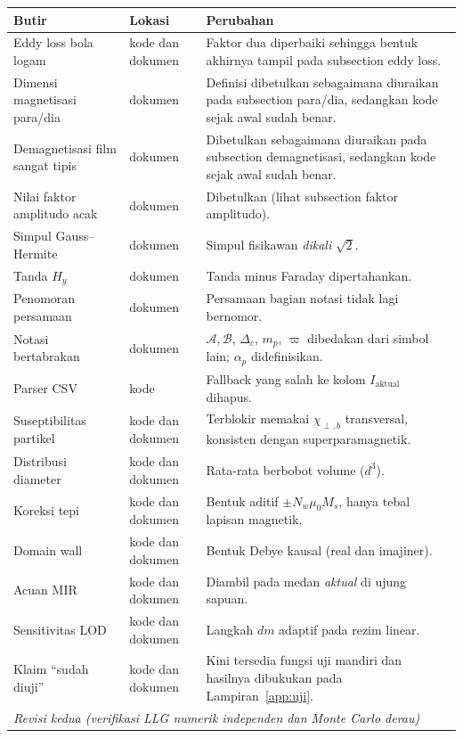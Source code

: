 \documentclass[a4paper,11pt]{article}
\begin{document}
\begin{center}
\small
\begin{tabular}{p{}p{}p{}}
\toprule
Butir & Lokasi & Perubahan\\
\midrule
Eddy loss bola logam & kode dan dokumen & Faktor dua diperbaiki sehingga
bentuk akhirnya tampil pada subsection eddy loss.\\
Dimensi magnetisasi para/dia & dokumen & Definisi dibetulkan sebagaimana
diuraikan pada subsection para/dia, sedangkan kode sejak awal sudah benar.\\
Demagnetisasi film sangat tipis & dokumen & Dibetulkan sebagaimana
diuraikan pada subsection demagnetisasi, sedangkan kode sejak awal sudah benar.\\
Nilai faktor amplitudo acak & dokumen & Dibetulkan
(lihat subsection faktor amplitudo).\\
Simpul Gauss--Hermite & dokumen & Simpul fisikawan \emph{dikali} $\sqrt{2}$.\\
Tanda $H_{y}$ & dokumen & Tanda minus Faraday dipertahankan.\\
Penomoran persamaan & dokumen & Persamaan bagian notasi tidak lagi bernomor.\\
Notasi bertabrakan & dokumen & $\mathcal{A},\mathcal{B}$, $\Delta_{c}$,
$m_{p}$, $\varpi$ dibedakan dari simbol lain; $\alpha_{p}$ didefinisikan.\\
Parser CSV & kode & Fallback yang salah ke kolom $I_{\mathrm{aktual}}$ dihapus.\\
Suseptibilitas partikel & kode dan dokumen & Terblokir memakai
$\chi_{\perp,b}$ transversal, konsisten dengan superparamagnetik.\\
Distribusi diameter & kode dan dokumen & Rata-rata berbobot volume ($d^{3}$).\\
Koreksi tepi & kode dan dokumen & Bentuk aditif $\pm N_{w}\mu_{0}M_{s}$,
hanya tebal lapisan magnetik.\\
Domain wall & kode dan dokumen & Bentuk Debye kausal (real dan imajiner).\\
Acuan MIR & kode dan dokumen & Diambil pada medan \emph{aktual} di ujung sapuan.\\
Sensitivitas LOD & kode dan dokumen & Langkah $dm$ adaptif pada rezim linear.\\
Klaim ``sudah diuji'' & kode dan dokumen & Kini tersedia fungsi uji mandiri
dan hasilnya dibukukan pada Lampiran~\ref{app:uji}.\\
\midrule
\multicolumn{3}{l}{\emph{Revisi kedua (verifikasi LLG numerik independen dan Monte Carlo derau)}}\\

\end{tabular}
\end{center}
\end{document}
